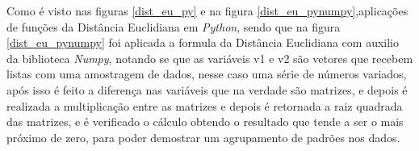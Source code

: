 \par Como é visto  nas figuras \ref{dist_eu_py} e na figura \ref{dist_eu_pynumpy},aplicações de funções da Distância Euclidiana em \emph{Python}, sendo que na figura \ref{dist_eu_pynumpy} foi aplicada a formula da Distância Euclidiana com auxilio da biblioteca \emph{Numpy}, notando se que as variáveis v1 e v2 são vetores que recebem listas com uma amostragem de dados, nesse caso uma série de números variados, após isso é feito a diferença nas variáveis que na verdade são matrizes, e depois é realizada a multiplicação entre as matrizes e depois é retornada a raiz quadrada das matrizes, e é verificado o cálculo obtendo o resultado que tende a ser o mais próximo de zero, para poder demostrar um agrupamento de padrões nos dados.


